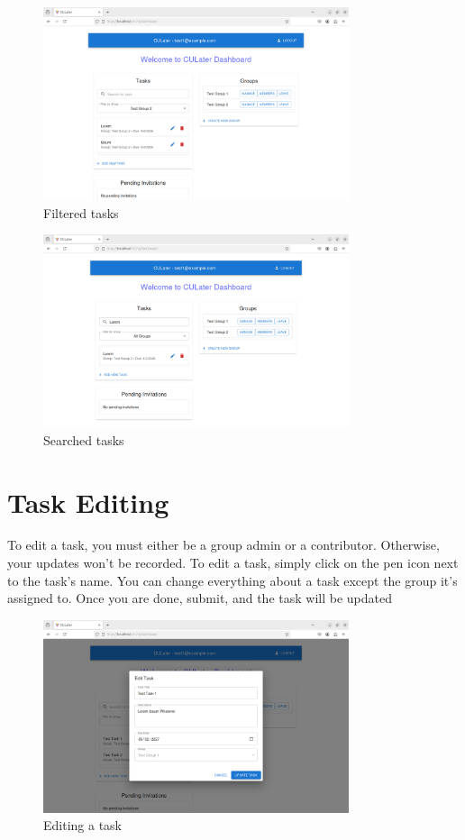 \documentclass{scrreprt}
\begin{document}
\begin{figure}[htbp]
        \centering
        \includegraphics[width=0.8\textwidth]{filtered.png}
	\caption{Filtered tasks}
	\label{fig:my_label}
\end{figure}
\begin{figure}[htbp]
        \centering
	\includegraphics[width=0.8\textwidth]{searched.png}
	\caption{Searched tasks}
	\label{fig:my_label}
\end{figure}

\chapter{Task Editing}

To edit a task, you must either be a group admin or a contributor. Otherwise, your updates won't be recorded. To edit a task, simply click on the pen icon next to the task's name. You can change everything about a task except the group it's assigned to. Once you are done, submit, and the task will be updated

\begin{figure}[htbp]
        \centering
	\includegraphics[width=0.8\textwidth]{edit_task.png}
	\caption{Editing a task}
	\label{fig:my_label}
\end{figure}
\end{document}
